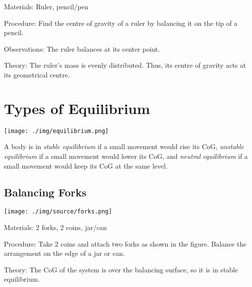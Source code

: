 \begin{multicols}{2}
\begin{description*}
\item[Materials:]{Ruler, pencil/pen}
\item[Procedure:]{Find the centre of gravity of a ruler by balancing it on the tip of a pencil.}
\item[Observations:]{The ruler balances at its center point.}
\item[Theory:]{The ruler's mass is evenly distributed. Thus, its centre of gravity acts at its geometrical centre.}
\end{description*}


\section*{Types of Equilibrium}

\begin{center}
\texttt{[image: ./img/equilibrium.png]}
\end{center}

A body is in \emph{stable equilibrium} if a small movement would rise its CoG, \emph{unstable equilibrium} if a small movement would lower its CoG, and \emph{neutral equilibrium} if a small movement would keep its CoG at the same level.

\subsection{Balancing Forks}

\begin{center}
\texttt{[image: ./img/source/forks.png]}
\end{center}

\begin{description*}
\item[Materials:]{2 forks, 2 coins, jar/can}
\item[Procedure:]{Take 2 coins and attach two forks as shown in the figure. Balance the arrangement on the edge of a jar or can.}
\item[Theory:]{The CoG of the system is over the balancing surface, so it is in stable equilibrium.}
\end{description*}


\end{multicols}
